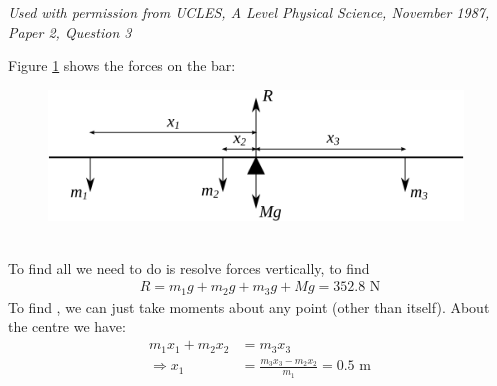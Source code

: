
\begin{problem} %
{

\nl {}}
{\textit{Used with permission from UCLES, A Level Physical Science, November 1987, Paper 2, Question 3}}
{
Figure \ref{fig:Statics_balancing} shows the forces on the bar:
\begin{figure}[h]
\centering
\includegraphics[width=11cm]{../../../figures/Statics_balancing.svg}
\caption{}
\label{fig:Statics_balancing}
\end{figure}
\\
To find  all we need to do is resolve forces vertically, to find
\begin{align*}
R=m_1g+m_2g+m_3g+Mg=352.8\textrm{ N}
\end{align*}
To find , we can just take moments about any point (other than  itself). About the centre we have:
\begin{align*}
m_1x_1+m_2x_2&=m_3x_3 \\
\Rightarrow x_1&=\frac{m_3x_3-m_2x_2}{m_1}=0.5\textrm{ m}
\end{align*}
}
\end{problem}